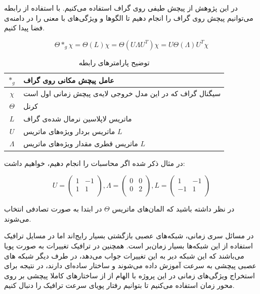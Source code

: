 \documentclass{article}
\begin{document}
در این پژوهش از پیچش طیفی روی گراف‌ استفاده می‌کنیم. 
با استفاده از رابطه  می‌توانیم پیچش روی گراف را انجام دهیم تا الگوها و ویژگی‌های با معنی را در دامنه‌ی فضا پیدا کنیم.

\begin{equation}
  \Theta *_{g} \chi = \Theta(L)\chi = \Theta(U \Lambda U^{T})\chi = U\Theta(\Lambda)U^{T}\chi
  \label{eq:convolution}
\end{equation}

\begin{table}[h]
  \centering
  \caption{توضیح پارامترهای رابطه }
  \begin{tabular}{|c|p{}|}
    \hline
    $*_{g}$ & عامل پیچش مکانی روی گراف \\
    \hline
    $\chi$ & سیگنال گراف که در این مدل خروجی لایه‌ی پیچش زمانی اول است \\
    \hline
    $\Theta$ & کرنل \\
    \hline
    $L$ & ماتریس لاپلاسین نرمال شده‌ی گراف \\
    \hline
    $U$ & ماتریس بردار ویژه‌های ماتریس $L$ \\
    \hline
    $\Lambda$ & ماتریس قطری مقدار ویژه‌های ماتریس $L$ \\
    \hline
  \end{tabular}
  \label{tbl:distance}
\end{table}

در مثال ذکر شده اگر محاسبات را انجام دهیم، خواهیم داشت:

\[
U = \left(
  \begin{array}{cc}
  1 & -1 \\
  1 & 1 \\
  \end{array}
\right),
\Lambda = \left(
  \begin{array}{cc}
  0 & 0 \\
  0 & 2 \\
  \end{array}
\right),
L = \left(
  \begin{array}{cc}
  1 & -1 \\
  -1 & 1 \\
  \end{array}
\right)
\]

در نظر داشته باشید که المان‌های ماتریس $\Theta$ در ابتدا به صورت تصادفی انتخاب می‌شوند.

در مسائل سری زمانی، شبکه‌های عصبی بازگشتی بسیار رایج‌اند اما در مسایل ترافیک استفاده از این شبکه‌ها بسیار زمان‌بر است.
همچنین در ترافیک تغییرات به صورت پویا می‌باشند که این شبکه دیر به این تغییرات جواب می‌دهد،
در طرف دیگر شبکه های عصبی پیچشی به سرعت آموزش داده می‌شوند و ساختار ساده‌ای دارند، در نتیجه برای استخراج ویژگی‌های زمانی در این پروژه با الهام از
 از ساختارهای کاملا پیچشی بر روی محور زمان استفاده می‌کنیم تا بتوانیم رفتار پویای سرعت ترافیک را دنبال کنیم.
\end{document}
